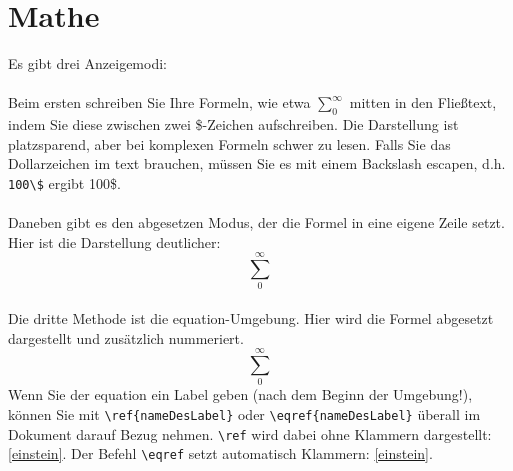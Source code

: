 \chapter{Mathe}

Es gibt drei Anzeigemodi:\\
\ \\
Beim ersten schreiben Sie Ihre Formeln, wie etwa $\sum_{0}^{\infty}$ mitten in den Fließtext, indem Sie diese zwischen zwei \$-Zeichen aufschreiben. Die Darstellung ist platzsparend, aber bei komplexen Formeln schwer zu lesen. Falls Sie das Dollarzeichen im text brauchen, müssen Sie es mit einem Backslash escapen, d.h. \verb|100\$| ergibt 100\$.\\
\ \\
Daneben gibt es den abgesetzen Modus, der die Formel in eine eigene Zeile setzt. Hier ist die Darstellung deutlicher:\[ \sum_{0}^{\infty} \]
\ \\
Die dritte Methode ist die equation-Umgebung. Hier wird die Formel abgesetzt dargestellt und zusätzlich nummeriert.
\begin{equation}\label{einstein}
\sum_{0}^{\infty}
\end{equation}
Wenn Sie der equation ein Label geben (nach dem Beginn der Umgebung!), können Sie mit \verb|\ref{nameDesLabel}| oder \verb|\eqref{nameDesLabel}| überall im Dokument darauf Bezug nehmen. \verb|\ref| wird dabei ohne Klammern dargestellt: \ref{einstein}. Der Befehl \verb|\eqref| setzt automatisch Klammern: \eqref{einstein}.